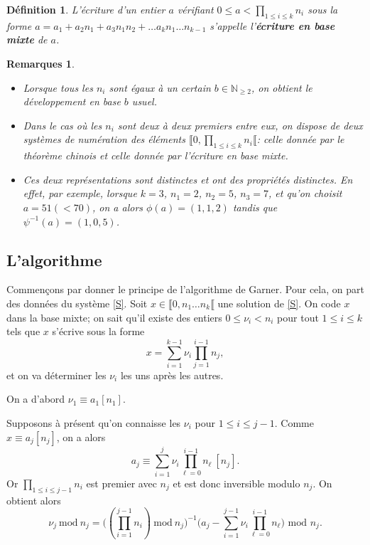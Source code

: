 \documentclass[12pt]{report}
\newtheorem*{rems}{Remarques}
\newtheorem{Def}[thm]{Définition}
\newcommand{\N}{\mathbb{N}}
\begin{document}
\begin{Def}
L'écriture d'un entier $a$ vérifiant $0 \leq a < \prod_{1 \leq i \leq k}n_i$ sous la forme $a= a_1+ a_2 n_1+ a_3 n_1 n_2+ \ldots  a_k n_1 \ldots n_{k-1}  $ s'appelle l'\textbf{écriture en base mixte} de $a$. 
\end{Def}

\begin{rems}\
\begin{itemize}
\item[•] Lorsque tous les $n_i$ sont égaux à un certain $b\in \N_{\geq 2}$, on obtient le développement en base $b$ usuel.

\item[•]
Dans le cas où les $n_i$ sont deux à deux premiers entre eux, on dispose de deux systèmes de numération des éléments $\llbracket 0, \prod_{1 \leq i \leq k}n_i \llbracket $: celle donnée par le théorème chinois et celle donnée par l'écriture en base mixte.
\item[•] Ces deux représentations sont distinctes et ont des propriétés distinctes. En effet, par exemple, lorsque $k=3$, $n_1=2$, $n_2=5$, $n_3=7$, et qu'on choisit $a=51 (< 70)$, on a alors $\phi(a)=(1,1,2)$  tandis que $\psi^{-1}(a)=(1,0,5)$.
\end{itemize}
\end{rems}


\subsection{L'algorithme}

Commençons par donner le principe de l'algorithme de Garner. Pour cela, on part des données du système \eqref{S}. Soit $x\in \llbracket 0,n_1\ldots n_k\llbracket$ une solution de \eqref{S}. On code $x$ dans la base mixte; on sait qu'il existe des entiers $0 \leq \nu_i < n_i $ pour tout $1 \leq i \leq k$ tels que $x$ s'écrive sous la forme
$$   x= \sum_{ i=1}^{k-1} \nu_i \prod_{ j=1}^{ i-1}n_j , $$
et on va déterminer les  $\nu_i$ les uns après les autres. \par 
On a d'abord $\nu_1 \equiv a_1 [n_1]$.\par 
Supposons à présent qu'on connaisse les $\nu_i$ pour $1 \leq i \leq j-1$. Comme $x \equiv a_j [n_j]$, on a alors
$$   a_j \equiv   \sum_{i=1}^{j} \nu_i \prod_{ \ell=0}^{i-1}n_{\ell}\   [n_j]  .   $$
Or $\prod_{1 \leq i \leq  j-1 } n_i $ est premier avec $n_j$ et est donc inversible modulo $n_j$. On obtient alors
$$     \nu_j\mathrm{\ mod\ }n_j=\Big( (\prod_{i=1}^{j-1}n_i) \mathrm{\ mod\ }n_j \Big)^{-1}  \Big( a_j-    \sum_{i=1}^{ j-1} \nu_i \prod_{\ell=0}^{i-1}n_{\ell} \Big)  \text{ mod } n_j.   $$
\end{document}
